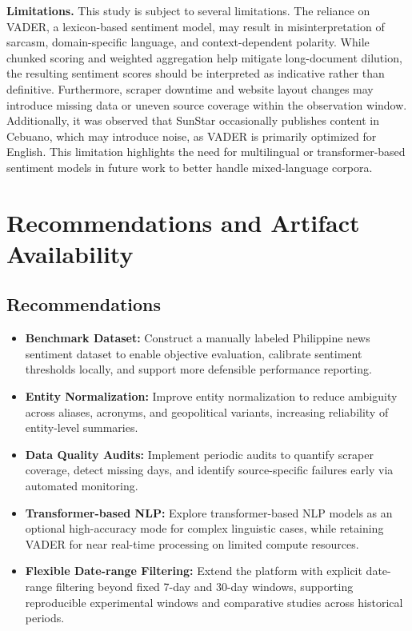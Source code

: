 \documentclass[sigconf, nonacm]{acmart}
\begin{document}
\textbf{Limitations.} This study is subject to several limitations. The reliance on VADER, a lexicon-based sentiment model, may result in misinterpretation of sarcasm, domain-specific language, and context-dependent polarity. While chunked scoring and weighted aggregation help mitigate long-document dilution, the resulting sentiment scores should be interpreted as indicative rather than definitive. Furthermore, scraper downtime and website layout changes may introduce missing data or uneven source coverage within the observation window. Additionally, it was observed that SunStar occasionally publishes content in Cebuano, which may introduce noise, as VADER is primarily optimized for English. This limitation highlights the need for multilingual or transformer-based sentiment models in future work to better handle mixed-language corpora.

\section{Recommendations and Artifact Availability}

\subsection{Recommendations}
\begin{itemize}
    \item \textbf{Benchmark Dataset:} Construct a manually labeled Philippine news sentiment dataset to enable objective evaluation, calibrate sentiment thresholds locally, and support more defensible performance reporting.
    \item \textbf{Entity Normalization:} Improve entity normalization to reduce ambiguity across aliases, acronyms, and geopolitical variants, increasing reliability of entity-level summaries.
    \item \textbf{Data Quality Audits:} Implement periodic audits to quantify scraper coverage, detect missing days, and identify source-specific failures early via automated monitoring.
    \item \textbf{Transformer-based NLP:} Explore transformer-based NLP models as an optional high-accuracy mode for complex linguistic cases, while retaining VADER for near real-time processing on limited compute resources.
    \item \textbf{Flexible Date-range Filtering:} Extend the platform with explicit date-range filtering beyond fixed 7-day and 30-day windows, supporting reproducible experimental windows and comparative studies across historical periods.
\end{itemize}
\end{document}
